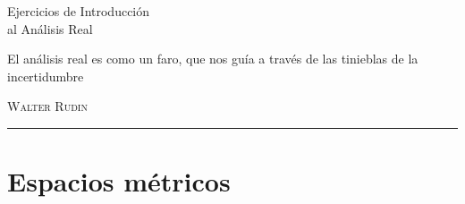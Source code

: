 \documentclass[12pt,a4paper]{report}
\begin{document}
\begin{titlepage}
\vspace*{2cm}

\noindent
\vspace*{0.5cm}
\titlefont Ejercicios de Introducción\\ al Análisis Real \par
\vspace{1.5cm}
\epigraph{El análisis real es como un faro, que nos guía a través de las tinieblas de la incertidumbre}%
{ \textsc{Walter Rudin}}
\null\vfill
\vspace*{1cm}
\noindent
\hfill
\begin{minipage}{0.45\linewidth}
    \begin{flushright}
        \printauthor
    \end{flushright}
\end{minipage}
%
\begin{minipage}{0.02\linewidth}
    \rule{1pt}{120pt}
\end{minipage}
\titlepagedecoration
\end{titlepage}


\tableofcontents
\cleardoublepage


\chapter{Espacios métricos}

\end{document}
